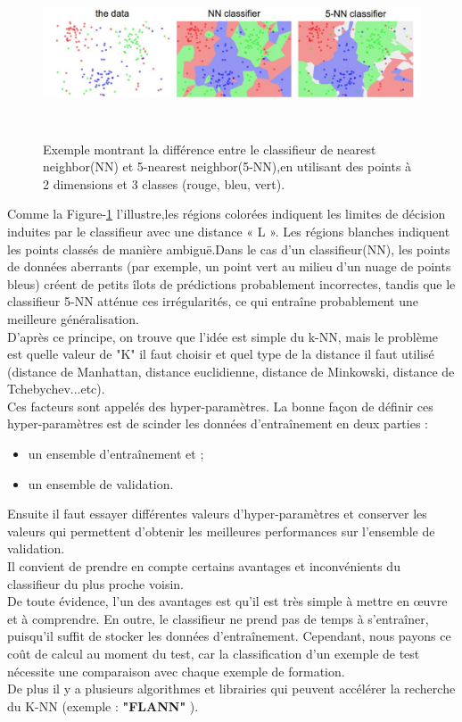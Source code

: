 \begin{figure}[h!]
      \centering
      \includegraphics[width=15cm,height=5cm]{images/rgt.png}
    \caption{Exemple montrant la différence entre le classifieur de nearest neighbor(NN) et 5-nearest neighbor(5-NN),en utilisant des points à 2 dimensions et 3 classes (rouge, bleu, vert).}
    \label{fig:Knn}
\end{figure}
\newpage
Comme la Figure-\ref{fig:Knn} l'illustre,les régions colorées indiquent les limites de décision induites par le classifieur avec une distance « L ». Les régions blanches indiquent les points classés de manière ambiguë.Dans le cas d'un classifieur(NN), les points de données aberrants (par exemple, un point vert au milieu d'un nuage de points bleus) créent de petits îlots de prédictions probablement incorrectes, tandis que le classifieur 5-NN atténue ces irrégularités, ce qui entraîne probablement une meilleure généralisation.\\
D’après ce principe, on trouve que l’idée est simple du k-NN, mais le problème est quelle valeur de "K" il faut choisir et quel type de la distance il faut utilisé (distance de Manhattan, distance euclidienne, distance de Minkowski, distance de Tchebychev...etc).\\
Ces facteurs sont appelés des hyper-paramètres. La bonne façon de définir ces hyper-paramètres est de scinder les données d’entraînement en deux parties :

\begin{itemize}
    \item un ensemble d’entraînement et ;
    \item un ensemble de validation.
\end{itemize}

Ensuite il faut essayer différentes valeurs d'hyper-paramètres et conserver les valeurs qui permettent d'obtenir les meilleures performances sur l'ensemble de validation.\\
Il convient de prendre en compte certains avantages et inconvénients du classifieur du plus proche voisin.\\
De toute évidence, l’un des avantages est qu’il est très simple à mettre en œuvre et à comprendre. En outre, le classifieur ne prend pas de temps à s’entraîner, puisqu’il suffit de stocker les données d’entraînement. Cependant, nous payons ce coût de calcul au moment du test, car la classification d'un exemple de test nécessite une comparaison avec chaque exemple de formation. \\
De plus il y a plusieurs algorithmes et librairies qui peuvent accélérer la recherche du K-NN (exemple :{\textbf{ "FLANN"}} ).\\

